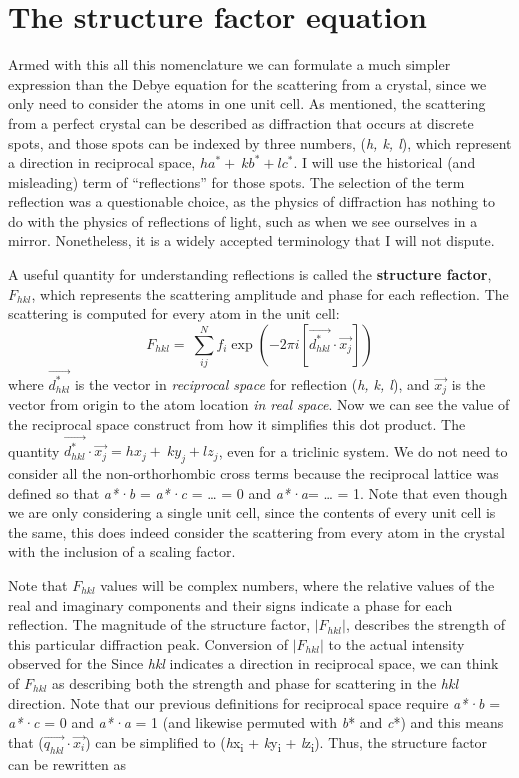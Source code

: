 \section{The structure factor equation}

Armed with this all this nomenclature we can formulate a much simpler expression than the Debye equation for the scattering from a crystal, since we only need to consider the atoms in one unit cell. As mentioned, the scattering from a perfect crystal can be described as diffraction that occurs at discrete spots, and those spots can be indexed by three numbers, (\textit{h, k, l}), which represent a direction in reciprocal space, $ha^\ast+\ kb^\ast+lc^\ast$. I will use the historical (and misleading) term of ``reflections'' for those spots. The selection of the term reflection was a questionable choice, as the physics of diffraction has nothing to do with the physics of reflections of light, such as when we see ourselves in a mirror. Nonetheless, it is a widely accepted terminology that I will not dispute. 

A useful quantity for understanding reflections is called the \textbf{structure factor}, $F_{hkl}$, which represents the scattering amplitude and phase for each reflection. 
The scattering is computed for every atom in the unit cell:
$$F_{hkl}=\ \sum_{ij}^{N}{f_i\exp(-2\pi i[\vec{d_{hkl}^\ast} \cdot  \vec{x_{j}}])}$$
where $\vec{d^*_{hkl}}$ is the vector in \textit{reciprocal space} for reflection (\textit{h, k, l}), and $\vec{x_j}$ is the vector from origin to the atom location \textit{in real space}. Now we can see the value of the reciprocal space construct from how it simplifies this dot product. 
The quantity $\vec{d_{hkl}^\ast}\cdot\vec{x_j} = hx_j+\ ky_j+lz_j$, even for a triclinic system. We do not need to consider all the non-orthorhombic cross terms because the reciprocal lattice was defined so that \textit{a*}\textit{·b} = \textit{a*}\textit{·c} = … = 0 and \textit{a*·a}= … = 1. Note that even though we are only considering a single unit cell, since the contents of every unit cell is the same, this does indeed consider the scattering from every atom in the crystal with the inclusion of a scaling factor.

Note that $F_{hkl}$ values will be complex numbers, where the relative values of the real and imaginary components and their signs indicate a phase for each reflection. The magnitude of the structure factor, $|F_{hkl}|$, describes the strength of this particular diffraction peak. Conversion of $|F_{hkl}|$ to the actual intensity observed for the Since \textit{hkl} indicates a direction in reciprocal space, we can think of $F_{hkl}$ as describing both the strength and phase for scattering in the \textit{hkl} direction. Note that our previous definitions for reciprocal space require \textit{a*·b} = \textit{a*·c} = 0 and \textit{a*·a} = 1 (and likewise permuted with \textit{b}* and \textit{c}*) and this means that ($\vec{q_{hkl}}\cdot\vec{x_i}$)  can be simplified to (\textit{h}x\textsubscript{i} + \textit{k}y\textsubscript{i} + \textit{l}z\textsubscript{i}). Thus, the structure factor can be rewritten as 

